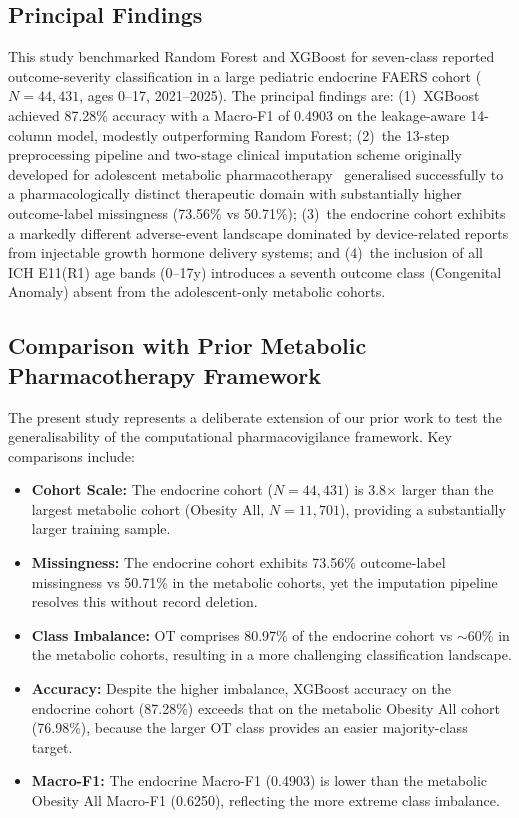 \documentclass[10pt,twocolumn]{article}
\newcommand{\FAERS}{\textsf{FAERS}\xspace}
\begin{document}
\subsection{Principal Findings}
This study benchmarked Random Forest and XGBoost for seven-class reported outcome-severity classification in a large pediatric endocrine \FAERS cohort ($N = 44{,}431$, ages 0--17, 2021--2025). The principal findings are: (1)~XGBoost achieved 87.28\% accuracy with a Macro-F1 of 0.4903 on the leakage-aware 14-column model, modestly outperforming Random Forest; (2)~the 13-step preprocessing pipeline and two-stage clinical imputation scheme originally developed for adolescent metabolic pharmacotherapy~\cite{telkar2026obesity} generalised successfully to a pharmacologically distinct therapeutic domain with substantially higher outcome-label missingness (73.56\% vs 50.71\%); (3)~the endocrine cohort exhibits a markedly different adverse-event landscape dominated by device-related reports from injectable growth hormone delivery systems; and (4)~the inclusion of all ICH E11(R1) age bands (0--17y) introduces a seventh outcome class (Congenital Anomaly) absent from the adolescent-only metabolic cohorts.
 
\subsection{Comparison with Prior Metabolic Pharmacotherapy Framework}
 
The present study represents a deliberate extension of our prior work to test the generalisability of the computational pharmacovigilance framework. Key comparisons include:
 
\begin{itemize}[leftmargin=*]
\item \textbf{Cohort Scale:} The endocrine cohort ($N = 44{,}431$) is 3.8$\times$ larger than the largest metabolic cohort (Obesity All, $N = 11{,}701$), providing a substantially larger training sample.
\item \textbf{Missingness:} The endocrine cohort exhibits 73.56\% outcome-label missingness vs 50.71\% in the metabolic cohorts, yet the imputation pipeline resolves this without record deletion.
\item \textbf{Class Imbalance:} OT comprises 80.97\% of the endocrine cohort vs $\sim$60\% in the metabolic cohorts, resulting in a more challenging classification landscape.
\item \textbf{Accuracy:} Despite the higher imbalance, XGBoost accuracy on the endocrine cohort (87.28\%) exceeds that on the metabolic Obesity All cohort (76.98\%), because the larger OT class provides an easier majority-class target.
\item \textbf{Macro-F1:} The endocrine Macro-F1 (0.4903) is lower than the metabolic Obesity All Macro-F1 (0.6250), reflecting the more extreme class imbalance.
\end{itemize}
 
\end{document}
